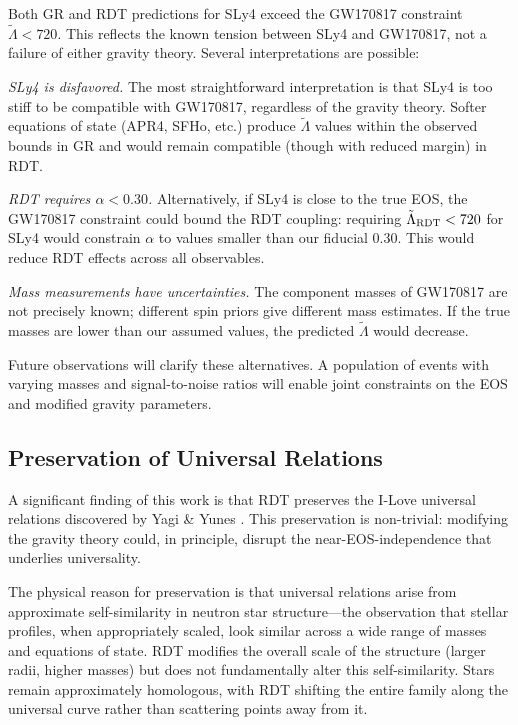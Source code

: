 \documentclass[twocolumn,showpacs,preprintnumbers,amsmath,amssymb,prd]{revtex4-2}
\begin{document}
Both GR and RDT predictions for SLy4 exceed the GW170817 constraint $\tilde{\Lambda} < 720$. This reflects the known tension between SLy4 and GW170817, not a failure of either gravity theory. Several interpretations are possible:

\textit{SLy4 is disfavored.} The most straightforward interpretation is that SLy4 is too stiff to be compatible with GW170817, regardless of the gravity theory. Softer equations of state (APR4, SFHo, etc.) produce $\tilde{\Lambda}$ values within the observed bounds in GR and would remain compatible (though with reduced margin) in RDT.

\textit{RDT requires $\alpha < 0.30$.} Alternatively, if SLy4 is close to the true EOS, the GW170817 constraint could bound the RDT coupling: requiring $\tilde{\Lambda}_{\rm RDT} < 720$ for SLy4 would constrain $\alpha$ to values smaller than our fiducial 0.30. This would reduce RDT effects across all observables.

\textit{Mass measurements have uncertainties.} The component masses of GW170817 are not precisely known; different spin priors give different mass estimates. If the true masses are lower than our assumed values, the predicted $\tilde{\Lambda}$ would decrease.

Future observations will clarify these alternatives. A population of events with varying masses and signal-to-noise ratios will enable joint constraints on the EOS and modified gravity parameters.

\subsection{Preservation of Universal Relations}
\label{sec:discussion_universal}

A significant finding of this work is that RDT preserves the I-Love universal relations discovered by Yagi \& Yunes \cite{Yagi2013}. This preservation is non-trivial: modifying the gravity theory could, in principle, disrupt the near-EOS-independence that underlies universality.

The physical reason for preservation is that universal relations arise from approximate self-similarity in neutron star structure---the observation that stellar profiles, when appropriately scaled, look similar across a wide range of masses and equations of state. RDT modifies the overall scale of the structure (larger radii, higher masses) but does not fundamentally alter this self-similarity. Stars remain approximately homologous, with RDT shifting the entire family along the universal curve rather than scattering points away from it.
\end{document}
